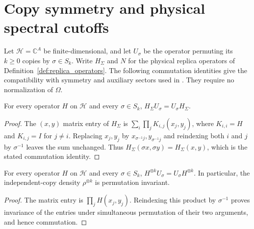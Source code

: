 \section{Copy symmetry and physical spectral cutoffs}
\label{sec:replica_copy_covariance}

Let $\mathcal H=\mathbb C^A$ be finite-dimensional, and let $U_\sigma$ be the
operator permuting its $k\ge0$ copies by $\sigma\in S_k$.
Write $H_\Sigma$ and $N$ for the physical replica operators of
Definition~\ref{def:replica_operators}.
The following commutation identities give the compatibility with symmetry
and auxiliary sectors used in \cite[Section~7]{OpenAI2026AreaLaw}.
They require no normalization of $\Omega$.

\begin{theorem}
\label{thm:replica_sum_copy_commute}
\leanok
{}
For every operator $H$ on $\mathcal H$ and every $\sigma\in S_k$,
$H_\Sigma U_\sigma=U_\sigma H_\Sigma$.
\end{theorem}
\begin{proof}
\leanok
The $(x,y)$ matrix entry of $H_\Sigma$ is
$\sum_i\prod_j K_{i,j}(x_j,y_j)$, where $K_{i,i}=H$ and $K_{i,j}=I$ for
$j\ne i$. Replacing $x_j,y_j$ by $x_{\sigma^{-1}j},y_{\sigma^{-1}j}$ and
reindexing both $i$ and $j$ by $\sigma^{-1}$ leaves the sum unchanged.
Thus $H_\Sigma(\sigma x,\sigma y)=H_\Sigma(x,y)$, which is the stated
commutation identity.
\end{proof}

\begin{theorem}
\label{thm:replica_product_copy_commute}
\leanok
For every operator $H$ on $\mathcal H$ and every $\sigma\in S_k$,
$H^{\otimes k}U_\sigma=U_\sigma H^{\otimes k}$.
In particular, the independent-copy density $\rho^{\otimes k}$ is
permutation invariant.
\end{theorem}
\begin{proof}
\leanok
The matrix entry is $\prod_j H(x_j,y_j)$.
Reindexing this product by $\sigma^{-1}$ proves invariance of the entries
under simultaneous permutation of their two arguments, and hence commutation.
\end{proof}

